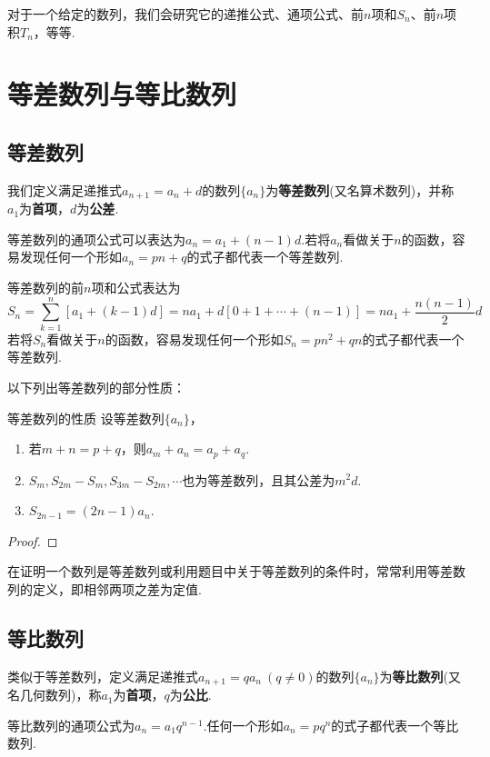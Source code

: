 \documentclass[lang=cn, zihao=4.5]{elegantbook}
\begin{document}
对于一个给定的数列，我们会研究它的递推公式、通项公式、前$n$项和$S_n$、前$n$项积$T_n$，等等.

\section{等差数列与等比数列}

\subsection{等差数列}

我们定义满足递推式$a_{n+1}=a_n+d$的数列$\{ a_n \}$为\textbf{等差数列}(又名算术数列)，并称$a_1$为\textbf{首项}，$d$为\textbf{公差}.

等差数列的通项公式可以表达为$a_n=a_1+(n-1)d$.若将$a_n$看做关于$n$的函数，容易发现任何一个形如$a_n=pn+q$的式子都代表一个等差数列.

等差数列的前$n$项和公式表达为$$S_n = \sum _{k=1}^{n} [a_1+(k-1)d] = na_1 + d[0+ 1 + \cdots +(n-1)] = na_1 + \frac{n(n-1)}{2}d$$
若将$S_n$看做关于$n$的函数，容易发现任何一个形如$S_n=pn^2+qn$的式子都代表一个等差数列.

以下列出等差数列的部分性质：

\begin{proposition}{等差数列的性质}
	设等差数列$\{ a_n \}$，
	\begin{enumerate}
		\item 若$m+n=p+q$，则$a_m+a_n=a_p+a_q$.
		\item $S_m,S_{2m}-S_m,S_{3m}-S_{2m},\cdots $也为等差数列，且其公差为$m^2d$.
		\item $S_{2n-1}=(2n-1)a_n$.
	\end{enumerate}
\end{proposition}
\begin{proof}
\end{proof}

在证明一个数列是等差数列或利用题目中关于等差数列的条件时，常常利用等差数列的定义，即相邻两项之差为定值.

\subsection{等比数列}

类似于等差数列，定义满足递推式$a_{n+1}=qa_n ~(q \neq 0)$的数列$\{ a_n \}$为\textbf{等比数列}(又名几何数列)，称$a_1$为\textbf{首项}，$q$为\textbf{公比}.

等比数列的通项公式为$a_n = a_1 q^{n-1}$.任何一个形如$a_n=pq^n$的式子都代表一个等比数列.
\end{document}
